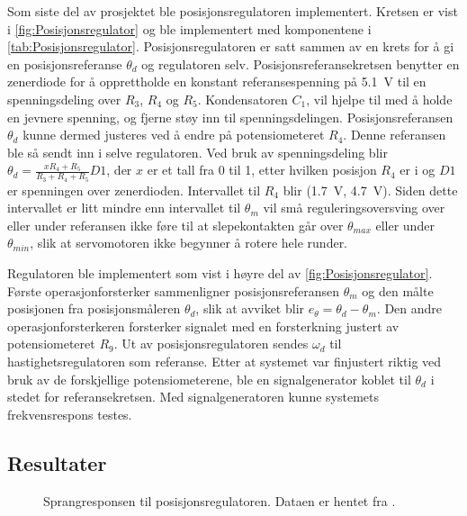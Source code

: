 Som siste del av prosjektet ble posisjonsregulatoren implementert. Kretsen er vist i \autoref{fig:Posisjonsregulator} og ble implementert med komponentene i \autoref{tab:Posisjonsregulator}. Posisjonsregulatoren er satt sammen av en krets for å gi en posisjonsreferanse $\theta_d$ og regulatoren selv.
Posisjonsreferansekretsen benytter en zenerdiode for å opprettholde en konstant referansespenning på {\SI{5.1}{\volt}} til en spenningsdeling over $R_3$, $R_4$ og $R_5$. 
Kondensatoren $C_1$, vil hjelpe til med å holde en jevnere spenning, og fjerne støy inn til spenningsdelingen. 
Posisjonsreferansen $\theta_d$ kunne dermed justeres ved å endre på potensiometeret $R_4$. Denne referansen ble så sendt inn i selve regulatoren. 
Ved bruk av spenningsdeling blir $\theta_d = \frac{x R_4 + R_5}{R_3 + R_4 + R_5} D1$, der $x$ er et tall fra 0 til 1, etter hvilken posisjon $R_4$ er i og $D1$ er spenningen over zenerdioden. 
Intervallet til $R_4$ blir (\SI{1.7}{\volt}, \SI{4.7}{\volt}). 
Siden dette intervallet er litt mindre enn intervallet til $\theta_m$ vil små reguleringsoversving over eller under referansen ikke føre til at slepekontakten går over $\theta_{max}$ eller under $\theta_{min}$, slik at servomotoren ikke begynner å rotere hele runder.

Regulatoren ble implementert som vist i høyre del av \autoref{fig:Posisjonsregulator}. Første operasjonforsterker sammenligner posisjonsreferansen $\theta_m$ og den målte posisjonen fra posisjonsmåleren $\theta_d$, slik at avviket blir $e_{\theta} = \theta_d - \theta_m$. Den andre operasjonforsterkeren forsterker signalet med en forsterkning justert av potensiometeret $R_9$. Ut av posisjonsregulatoren sendes $\omega_d$ til hastighetsregulatoren som referanse.
Etter at systemet var finjustert riktig ved bruk av de forskjellige potensiometerene, ble en signalgenerator koblet til $\theta_d$ i stedet for referansekretsen. Med signalgeneratoren kunne systemets frekvensrespons testes.







\subsection{Resultater}


\begin{figure}[h]
    \centering
    
    \caption{Sprangresponsen til posisjonsregulatoren. Dataen er hentet fra \cite{EksempelData}.}
    \label{fig:posisjon_P_regulator}
\end{figure}


